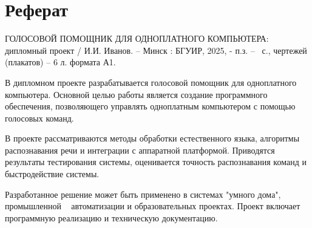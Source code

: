 \section*{Реферат}
\thispagestyle{empty} %

ГОЛОСОВОЙ ПОМОЩНИК ДЛЯ ОДНОПЛАТНОГО КОМПЬЮТЕРА: дипломный проект / И.И. Иванов. – Минск : БГУИР, 2025, - п.з. – \pageref{LastPage}~с., чертежей (плакатов) – 6 л. формата А1.

В дипломном проекте разрабатывается голосовой помощник для одноплатного компьютера. Основной целью работы является создание программного обеспечения, позволяющего управлять одноплатным компьютером с помощью голосовых команд. 

В проекте рассматриваются методы обработки естественного языка, алгоритмы распознавания речи и интеграции с аппаратной платформой. Приводятся результаты тестирования системы, оценивается точность распознавания команд и быстродействие системы. 

Разработанное решение может быть применено в системах "умного дома", промышленной ~\cite{rte-about} автоматизации и образовательных проектах. Проект включает программную реализацию и техническую документацию.

\clearpage
